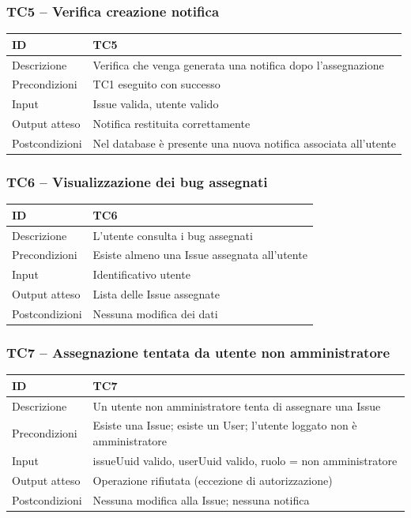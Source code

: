 \documentclass[a4paper,12pt]{article}
\begin{document}
\subsubsection{TC5 -- Verifica creazione notifica}
\label{sec:TC5}

\begin{tabularx}{\textwidth}{p{5cm}|X}
ID & TC5 \\ \hline
Descrizione & Verifica che venga generata una notifica dopo l'assegnazione \\ \hline
Precondizioni & TC1 eseguito con successo \\ \hline
Input & Issue valida, utente valido \\ \hline
Output atteso & Notifica restituita correttamente \\ \hline
Postcondizioni & Nel database è presente una nuova notifica associata all'utente \\ \hline
\end{tabularx}

\subsubsection{TC6 -- Visualizzazione dei bug assegnati}
\label{sec:TC6}

\begin{tabularx}{\textwidth}{p{5cm}|X}
ID & TC6 \\ \hline
Descrizione & L'utente consulta i bug assegnati \\ \hline
Precondizioni & Esiste almeno una Issue assegnata all'utente \\ \hline
Input & Identificativo utente \\ \hline
Output atteso & Lista delle Issue assegnate \\ \hline
Postcondizioni & Nessuna modifica dei dati \\ \hline
\end{tabularx}

\subsubsection{TC7 -- Assegnazione tentata da utente non amministratore}
\label{sec:TC7}

\begin{tabularx}{\textwidth}{p{5cm}|X}
ID & TC7 \\ \hline
Descrizione & Un utente non amministratore tenta di assegnare una Issue \\ \hline
Precondizioni & Esiste una Issue; esiste un User; l'utente loggato non è amministratore \\ \hline
Input & issueUuid valido, userUuid valido, ruolo = non amministratore \\ \hline
Output atteso & Operazione rifiutata (eccezione di autorizzazione) \\ \hline
Postcondizioni & Nessuna modifica alla Issue; nessuna notifica \\ \hline
\end{tabularx}
\end{document}
